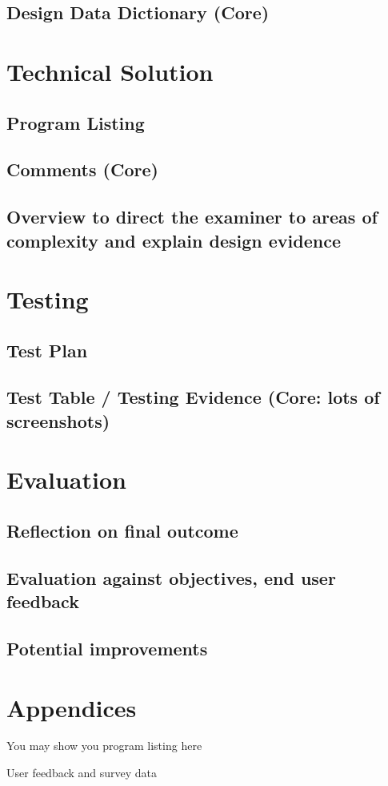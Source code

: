 \documentclass[titlepage]{article}
\begin{document}
\subsection{Design Data Dictionary (Core)}

\section{Technical Solution}

\subsection{Program Listing}

\subsection{Comments (Core)}

\subsection{Overview to direct the examiner to areas of complexity and explain design evidence}

\section{Testing}

\subsection{Test Plan}

\subsection{Test Table / Testing Evidence (Core: lots of screenshots)}

\section{Evaluation}

\subsection{Reflection on final outcome}

\subsection{Evaluation against objectives, end user feedback}

\subsection{Potential improvements}

\section{Appendices}

You may show you program listing here

User feedback and survey data
\end{document}
